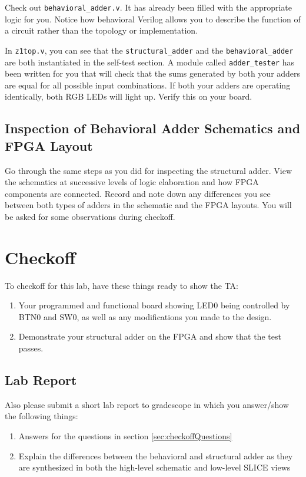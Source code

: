 \documentclass[11pt]{article}
\begin{document}
Check out \verb|behavioral_adder.v|. It has already been filled with the appropriate logic for you. Notice how behavioral Verilog allows you to describe the function of a circuit rather than the topology or implementation.

In \verb|z1top.v|, you can see that the \verb|structural_adder| and the \verb|behavioral_adder| are both instantiated in the self-test section. A module called \verb|adder_tester| has been written for you that will check that the sums generated by both your adders are equal for all possible input combinations. If both your adders are operating identically, both RGB LEDs will light up. Verify this on your board.

\subsection{Inspection of Behavioral Adder Schematics and FPGA Layout}

Go through the same steps as you did for inspecting the structural adder. View the schematics at successive levels of logic elaboration and how FPGA components are connected. Record and note down any differences you see between both types of adders in the schematic and the FPGA layouts. You will be asked for some observations during checkoff.

\section{Checkoff}
To checkoff for this lab, have these things ready to show the TA:
\begin{enumerate}
  \item Your programmed and functional board showing LED0 being controlled by BTN0 and SW0, as well as any modifications you made to the design.
  \item Demonstrate your structural adder on the FPGA and show that the test passes.
\end{enumerate}

\subsection{Lab Report}\label{sec:labreport}
Also please submit a short lab report to gradescope in which you answer/show the following things:
\begin{enumerate}
  \item Answers for the questions in section \ref{sec:checkoffQuestions}
  \item Explain the differences between the behavioral and structural adder as they are synthesized in both the high-level schematic and low-level SLICE views
\end{enumerate}
\end{document}
